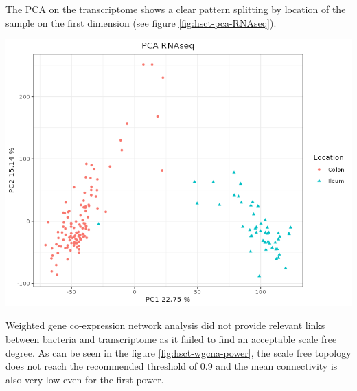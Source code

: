 \documentclass[
  12pt,
  a4paper,
  twoside,
  openright]{book}
\let\origfigure\figure
\let\endorigfigure\endfigure
\renewenvironment{figure}[1][2] {
    \expandafter\origfigure\expandafter[!htbp]
} {
    \endorigfigure
}
\begin{document}
The \protect\hyperlink{acronyms_PCA}{PCA} on the transcriptome shows a clear pattern splitting by location of the sample on the first dimension (see figure \ref{fig:hsct-pca-RNAseq}).

\begin{figure}
\includegraphics[width=1\linewidth]{images/HSCT_PCA_RNAseq} \caption[PCA of RNAseq data of the HSCT dataset.]{PCA of the RNAseq data of the HSCT dataset. The samples separate according to the location. Each point represents a sample (colored and shaped by location).}\label{fig:hsct-pca-RNAseq}
\end{figure}

Weighted gene co-expression network analysis did not provide relevant links between bacteria and transcriptome as it failed to find an acceptable scale free degree.
As can be seen in the figure \ref{fig:hsct-wgcna-power}, the scale free topology does not reach the recommended threshold of 0.9 and the mean connectivity is also very low even for the first power.
\end{document}
